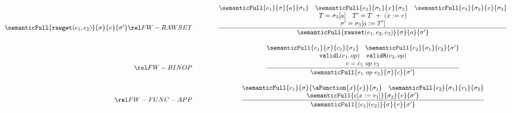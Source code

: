 \begin{figure}[P]
\[\begin{array}{r@{\qquad\qquad}c}
{}{
  \semanticFull {{\tt rawget}(e_1,e_2)} {\sigma}   {v} {\sigma'}
}
\ssrule{FW-RAWSET}{
  \semanticFull{e_1}{\sigma}{a}{\sigma_1} \quad
  \semanticFull{e_2}{\sigma_1}{x}{\sigma_2} \quad
  \semanticFull{e_3}{\sigma_2}{v}{\sigma_3} \\
  T = \sigma_3[a] \quad
  T' = T~+~(x := v) \\
  \sigma' = \sigma_3[a:=T']
}{
  \semanticFull{{\tt rawset}(e_1,e_2,e_3)}{\sigma}{a}{\sigma'}
}
\ssrule{FW-BINOP}{
  \semanticFull{e_1}{\sigma}{c_1}{\sigma_1} \quad
  \semanticFull{e_2}{\sigma_1}{c_2}{\sigma'} \\
  {\tt validL}(c_1, op) \quad
  {\tt validR}(c_2, op) \\
  c = c_1 ~op~ c_2
}{
  \semanticFull{e_1 ~op~ e_2}{\sigma}{c}{\sigma'}
}
\ssrule{FW-FUNC-APP}{
  \semanticFull{e_1}{\sigma}{\aFunction{x}{e}}{\sigma_1} \quad
  \semanticFull{e_2}{\sigma_1}{v_1}{\sigma_2} \\
  \semanticFull{e[x:=v_1]}{\sigma_2}{v}{\sigma'} 
}{
  \semanticFull{(e_1)(e_2)}{\sigma}{v}{\sigma'} 
}
\end{array}
\]
\end{figure}
